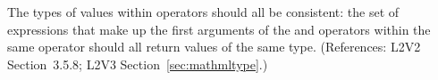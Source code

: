 The types of values within  operators should all
be consistent: the set of expressions that make up the first
arguments of the  and  operators
within the same  operator should all return
values of the same type.  (References: L2V2 Section~3.5.8; L2V3
Section~\ref{sec:mathmltype}.)
